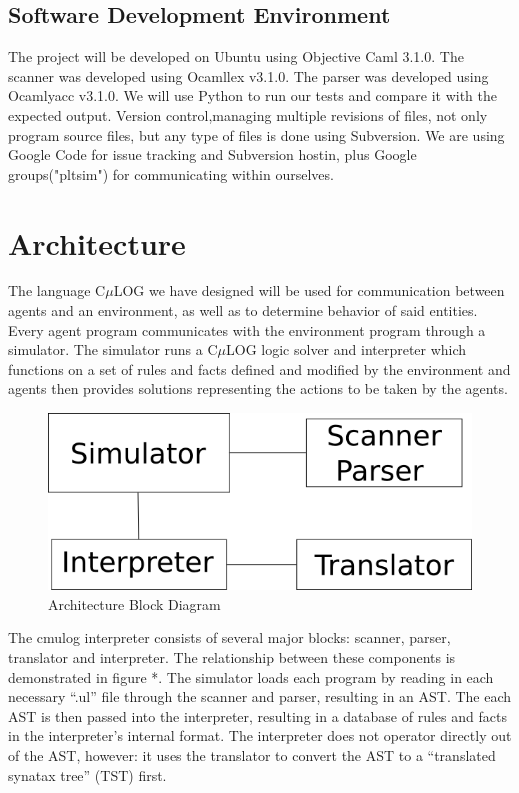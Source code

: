 \documentclass[onecolumn,titlepage]{article}
\begin{document}
\subsection{Software Development Environment}
The project will be developed on Ubuntu using Objective Caml
3.1.0. The scanner was developed using Ocamllex v3.1.0. The parser was
developed using Ocamlyacc v3.1.0. We will use Python to run our tests
and compare it with the expected output. Version control,managing
multiple revisions of files, not only program source files, but any
type of files is done using Subversion. We are using Google Code for
issue tracking and Subversion hostin, plus Google groups("pltsim") for
communicating within ourselves.

\section{Architecture}

The language C$\mu$LOG we have designed will be used for communication
between agents and an environment, as well as to determine behavior of
said entities. Every agent program communicates with the environment
program through a simulator. The simulator runs a C$\mu$LOG logic
solver and interpreter which functions on a set of rules and facts
defined and modified by the environment and agents then provides
solutions representing the actions to be taken by the agents.

\begin{figure}[htp]
\label{block}
\caption{ Architecture Block Diagram }
\begin{center}
\includegraphics[scale=.6]{block.png}
\end{center}
\end{figure}

The cmulog interpreter consists of several major blocks: scanner,
parser, translator and interpreter. The relationship between these
components is demonstrated in figure *.  The simulator loads each
program by reading in each necessary ``.ul'' file through the scanner
and parser, resulting in an AST.  The each AST is then passed into the
interpreter, resulting in a database of rules and facts in the
interpreter's internal format.  The interpreter does not operator
directly out of the AST, however: it uses the translator to convert
the AST to a ``translated synatax tree'' (TST) first.  
\end{document}
